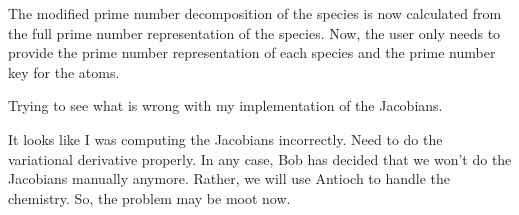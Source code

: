\documentclass[fontsize=11pt, %
               paper=a4, %
               oneside, %
               captions=tableheading,
               index=totoc,
               hyperref]{labbook}
\newcommand{\lr}[1]{\left(#1\right)}
\newcommand{\pdeone}[2]{\frac{\partial #1}{\partial #2}}
\begin{document}
The modified prime number decomposition of the species is now calculated from the full prime number representation of the species.  Now, the user only needs to provide the prime number representation of each species and the prime number key for the atoms.

Trying to see what is wrong with my implementation of the Jacobians.

It looks like I was computing the Jacobians incorrectly.  Need to do the variational derivative properly.  In any case, Bob has decided that we won't do the Jacobians manually anymore.  Rather, we will use Antioch to handle the chemistry.  So, the problem may be moot now.
%
%
%


\end{document}
